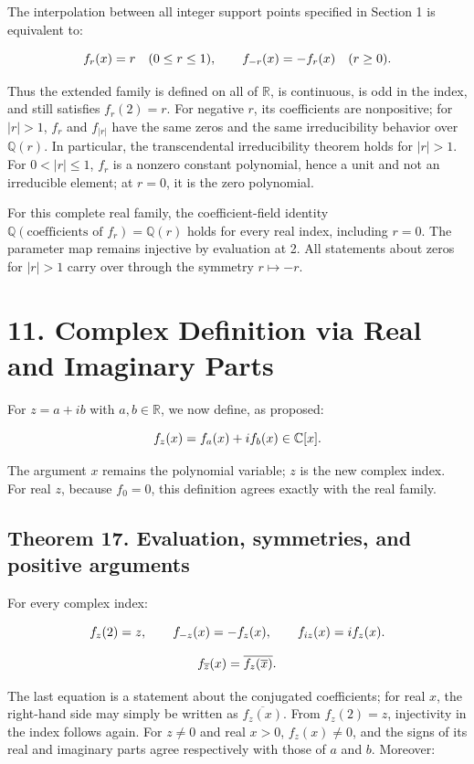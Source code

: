 \documentclass[11pt,a4paper]{article}
\newcommand{\fitmath}[1]{\begingroup\setbox0=\hbox{$\displaystyle #1$}\ifdim\wd0>\linewidth\resizebox{\linewidth}{!}{\box0}\else\box0\fi\endgroup}
\begin{document}
The interpolation between all integer support points specified in Section 1 is equivalent to:


\[
\fitmath{f_r(x)=r\quad(0\leq r\leq1),\qquad f_{-r}(x)=-f_r(x)\quad(r\geq0).}
\]


Thus the extended family is defined on all of $\mathbb R$, is continuous, is odd in the index, and still satisfies $f_r(2)=r$. For negative $r$, its coefficients are nonpositive; for $|r|>1$, $f_r$ and $f_{|r|}$ have the same zeros and the same irreducibility behavior over $\mathbb Q(r)$. In particular, the transcendental irreducibility theorem holds for $|r|>1$. For $0<|r|\leq1$, $f_r$ is a nonzero constant polynomial, hence a unit and not an irreducible element; at $r=0$, it is the zero polynomial.


For this complete real family, the coefficient-field identity $\mathbb Q(\text{coefficients of }f_r)=\mathbb Q(r)$ holds for every real index, including $r=0$. The parameter map remains injective by evaluation at 2. All statements about zeros for $|r|>1$ carry over through the symmetry $r\mapsto-r$.


\section*{11. Complex Definition via Real and Imaginary Parts}

For $z=a+ib$ with $a,b\in\mathbb R$, we now define, as proposed:


\[
\fitmath{f_z(x)=f_a(x)+i f_b(x)\in\mathbb C[x].}
\]


The argument $x$ remains the polynomial variable; $z$ is the new complex index. For real $z$, because $f_0=0$, this definition agrees exactly with the real family.


\subsection*{Theorem 17. Evaluation, symmetries, and positive arguments}

For every complex index:


\[
\fitmath{f_z(2)=z,\qquad f_{-z}(x)=-f_z(x),\qquad f_{iz}(x)=i f_z(x).}
\]


\[
\fitmath{f_{\overline z}(x)=\overline{f_z(\overline x)}.}
\]


The last equation is a statement about the conjugated coefficients; for real $x$, the right-hand side may simply be written as $\overline{f_z(x)}$. From $f_z(2)=z$, injectivity in the index follows again. For $z\ne0$ and real $x>0$, $f_z(x)\ne0$, and the signs of its real and imaginary parts agree respectively with those of $a$ and $b$. Moreover:
\end{document}
